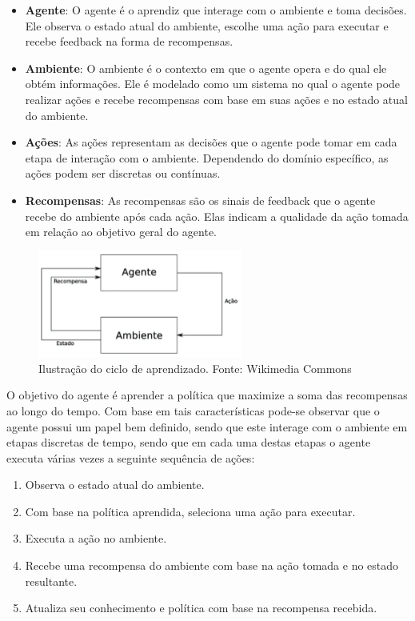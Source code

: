 \begin{itemize}
\item \textbf{Agente}: O agente é o aprendiz que interage com o ambiente e toma decisões. Ele observa o estado atual do ambiente, escolhe uma ação para executar e recebe feedback na forma de recompensas. 

\item \textbf{Ambiente}: O ambiente é o contexto em que o agente opera e do qual ele obtém informações. Ele é modelado como um sistema no qual o agente pode realizar ações e recebe recompensas com base em suas ações e no estado atual do ambiente. 

\item \textbf{Ações}: As ações representam as decisões que o agente pode tomar em cada etapa de interação com o ambiente. Dependendo do domínio específico, as ações podem ser discretas ou contínuas.


\item \textbf{Recompensas}: As recompensas são os sinais de feedback que o agente recebe do ambiente após cada ação. Elas indicam a qualidade da ação tomada em relação ao objetivo geral do agente. 

\end{itemize}

\begin{figure}[H]
 \centering
 \includegraphics[width=0.60\textwidth]{./fig/RL_ilustracao.png}

 \caption{Ilustração do ciclo de aprendizado.
 Fonte: Wikimedia Commons}
 \label{fig:rl_ilustracao}
\end{figure}

O objetivo do agente é aprender a política que maximize a soma das recompensas ao longo do tempo. Com base em tais características pode-se observar que o agente possui um papel bem definido, sendo que este interage com o ambiente em etapas discretas de tempo, sendo que em cada uma destas etapas o agente executa várias vezes a seguinte sequência de ações:

\begin{enumerate}
\item Observa o estado atual do ambiente.
\item Com base na política aprendida, seleciona uma ação para executar.
\item Executa a ação no ambiente.
\item Recebe uma recompensa do ambiente com base na ação tomada e no estado resultante.
\item Atualiza seu conhecimento e política com base na recompensa recebida.
\end{enumerate}

